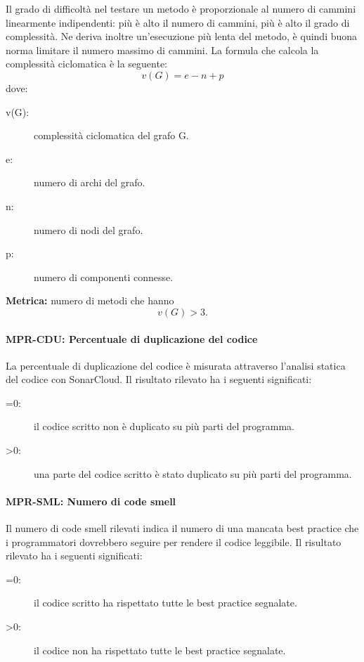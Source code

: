 \documentclass[../../norme-di-progetto.tex]{subfiles}
\begin{document}
Il grado di difficoltà nel testare un metodo è proporzionale al numero di cammini linearmente indipendenti: più è alto il numero di cammini, più è alto il grado di complessità. 
Ne deriva inoltre un'esecuzione più lenta del metodo, è quindi buona norma limitare il numero massimo di cammini. La formula che calcola la complessità ciclomatica è la seguente:
\[
 v(G) = e - n + p
\]
dove:
\begin{description}
 \item[v(G):] complessità ciclomatica del grafo G. %
 \item[e:] numero di archi del grafo.
 \item[n:] numero di nodi del grafo.
 \item[p:] numero di componenti connesse.
\end{description}
\textbf{Metrica:} numero di metodi che hanno \[v(G) > 3.\]




\paragraph{MPR-CDU: Percentuale di duplicazione del codice}%
\label{par:MPR-CDU_percentuale_duplicazione_codice}

La percentuale di duplicazione del codice è misurata attraverso l'analisi statica del codice con SonarCloud.
Il risultato rilevato ha i seguenti significati:
\begin{description}
  \item[=0:] il codice scritto non è duplicato su più parti del programma.
  \item[>0:] una parte del codice scritto è stato duplicato su più parti del programma.
\end{description}


\paragraph{MPR-SML: Numero di code smell}%
\label{par:MPR-SML_numero_di_code_smell}

Il numero di code smell rilevati indica il numero di una mancata best practice che i programmatori dovrebbero seguire per rendere il codice leggibile.
Il risultato rilevato ha i seguenti significati:
\begin{description}
  \item[=0:] il codice scritto ha rispettato tutte le best practice segnalate.
  \item[>0:] il codice non ha rispettato tutte le best practice segnalate.
\end{description}
\end{document}
